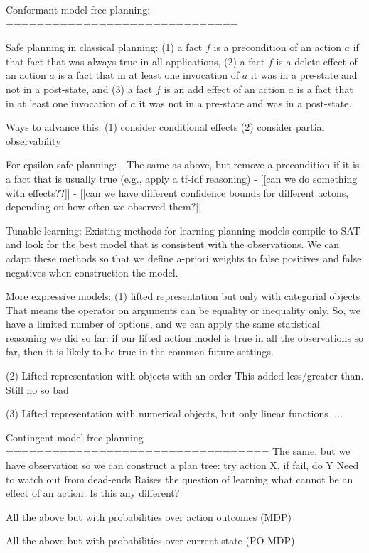 
Conformant model-free planning:
==============================

Safe planning in classical planning:
(1) a fact $f$ is a precondition of an action $a$ if that fact that was always true in all applications, 
(2) a fact $f$ is a delete effect of an action $a$ is a fact 
that in at least one invocation of $a$ it was in a pre-state and not in a post-state, and 
(3) a fact $f$ is an add effect of an action $a$ is a fact 
that in at least one invocation of $a$ it was not in a pre-state and was in a post-state. 

Ways to advance this:
(1) consider conditional effects
(2) consider partial observability

For epsilon-safe planning:
- The same as above, but remove a precondition if it is a fact that is usually true (e.g., apply a tf-idf reasoning)
- [[can we do something with effects??]]
- [[can we have different confidence bounds for different actons, depending on how often we observed them?]]


Tunable learning:
Existing methods for learning planning models compile to SAT and look for the best model that is consistent with the observations.
We can adapt these methods so that we define a-priori weights to false positives and false negatives when construction the model.

More expressive models:
(1) lifted representation but only with categorial objects
That means the operator on arguments can be
equality or inequality only. So, we have a limited number of options, and we can apply the same statistical reasoning we did so far:
if our lifted action model is true in all the observations so far, then it is likely to be true in the common future settings. 

(2) Lifted representation with objects with an order
This added less/greater than. 
Still no so bad

(3) Lifted representation with numerical objects, but only linear functions
....


Contingent model-free planning
================================== 
The same, but we have observation so we can construct a plan tree: try action X, if fail, do Y
Need to watch out from dead-ends
Raises the question of learning what cannot be an effect of an action. Is this any different?



All the above but with probabilities over action outcomes (MDP)


All the above but with probabilities over current state  (PO-MDP)




